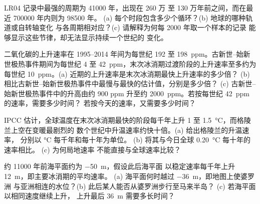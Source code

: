 \begin{exercise}[$\star\star\star$]\label{exo:g12:past-climates:12}
LR04 记录中最强的周期为 \num{41000} 年，出现在 260 万
至 130 万年前之间，而在最近 \num{700000} 年内则为 \num{98500} 年。
(a) 每个时段包含多少个循环？(b) 地球的哪种轨道或自转轴变化
与各周期相对应？(c) 请解释为何每 \num{2000} 年取一个样本的记录
能够显示这些节律，却无法显示持续一个世纪的
变化。
\end{exercise}

\begin{exercise}[$\star\star\star$]\label{exo:g12:past-climates:13}
二氧化碳的上升速率在 1995--2014 年间为每世纪 192 至
\qty{198}{ppm}。古新世–始新世极热事件期间为每世纪 4 至
\qty{42}{ppm}，末次冰消期过渡阶段的上升速率至多约为
每世纪 \qty{10}{ppm}。(a) 近期的上升速率是末次冰消期最快上升速率的多少倍？
(b) 相比古新世–始新世极热事件中最慢与最快的估计值，分别是多少倍？
(c) 古新世–始新世极热事件中的升高由约 900 ppm 升至约
\qty{2000}{ppm}。若按每世纪 \qty{42}{ppm} 的速率，需要多少时间？
若按今天的速率，又需要多少时间？
\end{exercise}

\begin{exercise}[$\star\star\star$]\label{exo:g12:past-climates:14}
IPCC 估计，全球温度在末次冰消期最快的阶段每千年上升 1 至
\qty{1.5}{\degreeCelsius}，而格陵兰上空在变暖最剧烈的
数个世纪中升温速率约快十倍。(a) 给出格陵兰的升温速率，
分别以 \unit{\degreeCelsius} 每千年和每十年为单位。
(b) 将其与今日全球 \qty{0.20}{\degreeCelsius} 每十年的速率相比。
(c) 为何局地速率
不能直接与全球速率比较？
\end{exercise}

\begin{exercise}[$\star\star\star$]\label{exo:g12:past-climates:15}
约 \num{11000} 年前海平面约为 \qty{-50}{m}，假设此后海平面
以稳定速率每千年上升 \qty{12}{m}，即主要冰消期的平均速率。
(a) 海平面何时越过 \qty{-36}{m}，即地图上使婆罗洲
与亚洲相连的水位？(b) 此后某人能否从婆罗洲步行至马来半岛？
(c) 若海平面以相同速度继续上升，
上升最后 \qty{36}{m} 需要多长时间？
\end{exercise}

